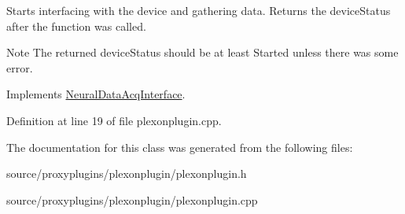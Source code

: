 Starts interfacing with the device and gathering data. Returns the device\-Status after the function was called. 

\begin{DoxyNote}{Note}
The returned device\-Status should be at least Started unless there was some error. 
\end{DoxyNote}


Implements \hyperlink{class_neural_data_acq_interface_afaece5bd061753aa9a4b1e05c0d1e61d}{Neural\-Data\-Acq\-Interface}.



Definition at line 19 of file plexonplugin.\-cpp.



The documentation for this class was generated from the following files\-:\begin{DoxyCompactItemize}
\item 
source/proxyplugins/plexonplugin/plexonplugin.\-h\item 
source/proxyplugins/plexonplugin/plexonplugin.\-cpp\end{DoxyCompactItemize}
